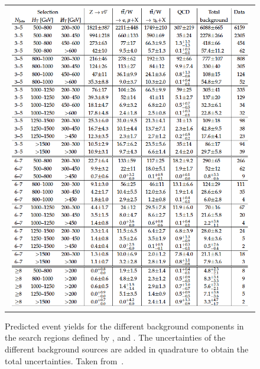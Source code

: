 \begin{figure}[!t]
  \centering
  \begin{tabular}{c}
    \includegraphics[width=0.99\textwidth]{figures/RA2_results_tab.png}
  \end{tabular}
  \caption{Predicted event yields for the different background components in the search regions defined by \HT, \MHT and \NJets. The uncertainties of the different background sources are added in quadrature to obtain the total uncertainties. Taken from~\cite{Chatrchyan:2014lfa}.}
  \label{fig:ra2_results_tab}
\end{figure}

